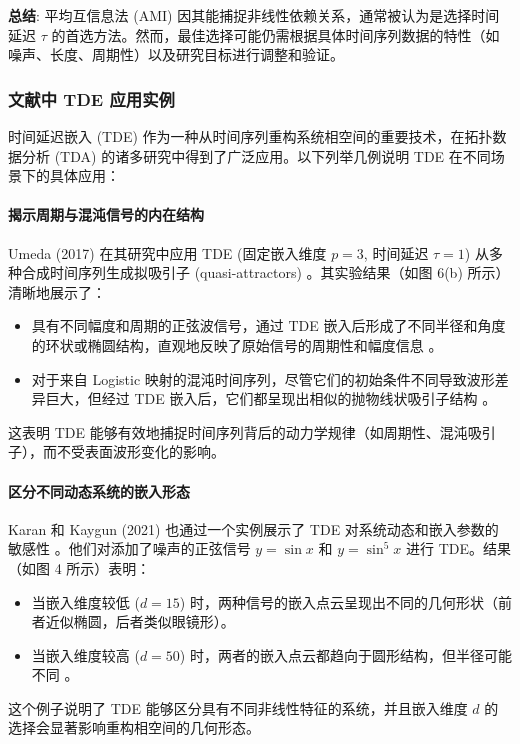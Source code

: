\textbf{总结}: 平均互信息法 (AMI) 因其能捕捉非线性依赖关系，通常被认为是选择时间延迟 $\tau$ 的首选方法。然而，最佳选择可能仍需根据具体时间序列数据的特性（如噪声、长度、周期性）以及研究目标进行调整和验证。

\subsubsection{文献中 TDE 应用实例}
\label{sec:tde_examples}

时间延迟嵌入 (TDE) 作为一种从时间序列重构系统相空间的重要技术，在拓扑数据分析 (TDA) 的诸多研究中得到了广泛应用。以下列举几例说明 TDE 在不同场景下的具体应用：

\paragraph{揭示周期与混沌信号的内在结构}
Umeda (2017) 在其研究中应用 TDE (固定嵌入维度 $p=3$, 时间延迟 $\tau=1$) 从多种合成时间序列生成拟吸引子 (quasi-attractors) \cite{Umeda2017TSClassificationViaTDA}。其实验结果（如图 6(b) 所示）清晰地展示了：
\begin{itemize}
    \item 具有不同幅度和周期的正弦波信号，通过 TDE 嵌入后形成了不同半径和角度的环状或椭圆结构，直观地反映了原始信号的周期性和幅度信息 \cite{Umeda2017TSClassificationViaTDA}。
    \item 对于来自 Logistic 映射的混沌时间序列，尽管它们的初始条件不同导致波形差异巨大，但经过 TDE 嵌入后，它们都呈现出相似的抛物线状吸引子结构 \cite{Umeda2017TSClassificationViaTDA}。
\end{itemize}
这表明 TDE 能够有效地捕捉时间序列背后的动力学规律（如周期性、混沌吸引子），而不受表面波形变化的影响。

\paragraph{区分不同动态系统的嵌入形态}
Karan 和 Kaygun (2021) 也通过一个实例展示了 TDE 对系统动态和嵌入参数的敏感性 \cite{Karan2021TSClassificationViaTDA}。他们对添加了噪声的正弦信号 $y = \sin x$ 和 $y = \sin^5 x$ 进行 TDE。结果（如图 4 所示）表明：
\begin{itemize}
    \item 当嵌入维度较低 ($d=15$) 时，两种信号的嵌入点云呈现出不同的几何形状（前者近似椭圆，后者类似眼镜形）\cite{Karan2021TSClassificationViaTDA}。
    \item 当嵌入维度较高 ($d=50$) 时，两者的嵌入点云都趋向于圆形结构，但半径可能不同 \cite{Karan2021TSClassificationViaTDA}。
\end{itemize}
这个例子说明了 TDE 能够区分具有不同非线性特征的系统，并且嵌入维度 $d$ 的选择会显著影响重构相空间的几何形态。

